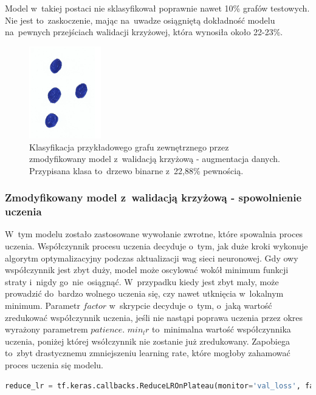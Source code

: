 Model w~takiej postaci nie sklasyfikował poprawnie nawet 10\% grafów testowych.
Nie jest to~zaskoczenie, mając na~uwadze osiągniętą dokładność modelu na~pewnych przejściach walidacji krzyżowej,
która wynosiła około 22-23\%.

\begin{figure}[ht]
	\centering
	\includegraphics[height=4cm]{../graph_classification/test_graphs/drawn/empty-8.png}
	\caption{Klasyfikacja przykładowego grafu zewnętrznego przez zmodyfikowany model z~walidacją krzyżową - augmentacja danych.
		Przypisana klasa to~drzewo binarne z~22,88\% pewnością.}
	\label{Fig:tests-cv-3d}
\end{figure}
\FloatBarrier

\subsubsection{Zmodyfikowany model z~walidacją krzyżową - spowolnienie uczenia}

W~tym modelu zostało zastosowane wywołanie zwrotne, które spowalnia proces uczenia.
Współczynnik procesu uczenia decyduje o~tym, jak duże kroki wykonuje algorytm optymalizacyjny podczas aktualizacji wag sieci neuronowej.
Gdy owy współczynnik jest zbyt duży, model może oscylować wokół minimum funkcji straty i~nigdy go~nie~osiągnąć.
W~przypadku kiedy jest zbyt mały, może prowadzić do~bardzo wolnego uczenia się, czy nawet utknięcia w~lokalnym minimum.
Parametr $factor$ w~skrypcie decyduje o~tym, o~jaką wartość zredukować współczynnik uczenia,
jeśli nie nastąpi poprawa uczenia przez okres wyrażony parametrem $patience$.
$min_lr$ to~minimalna wartość współczynnika uczenia, poniżej której wsółczynnik nie zostanie już zredukowany.
Zapobiega to~zbyt drastycznemu zmniejszeniu learning rate, które mogłoby zahamować proces uczenia się modelu.

\begin{lstlisting}[language=Python,caption=Listing zmodyfikowanego skryptu
	znajdującego się bezpośrdenio po~tworzeniu modelu z~walidacją krzyżową - wersja 4,label={tests-model-crossval4}]
	reduce_lr = tf.keras.callbacks.ReduceLROnPlateau(monitor='val_loss', factor=0.2, patience=5, min_lr=0.001)
\end{lstlisting}

